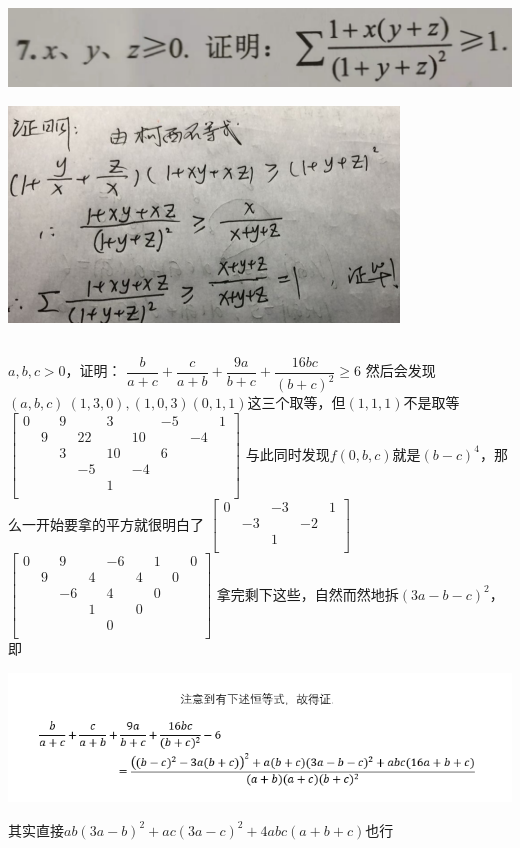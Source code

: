 \documentclass[UTF8]{ctexart}
\begin{document}
\subsection{}
\begin{center}
	\includegraphics[width=0.5\linewidth]{a30}
\end{center}
\begin{center}
	\includegraphics[width=0.5\linewidth]{a31}
\end{center}
\subsection{}$ a,b,c> 0 $，证明：
$ \dfrac{b}{a+c}+\dfrac{c}{a+b}+\dfrac{9a}{b+c}+\dfrac{16bc}{(b+c)^{2}} \geq 6$
然后会发现$ (a,b,c)~(1,3,0),(1,0,3)(0,1,1) $这三个取等，但$ (1,1,1) $不是取等
$ \left[\begin{matrix}
	0& &9& &3& &-5& &1\\
	&9& &22& &10& &-4&\\
	& &3& &10& &6& &\\
	& & &-5& &-4& & &\\
	& & & &1& & & &\\
\end{matrix}\right] $
与此同时发现$ f(0,b,c) $就是$ (b-c)^4 $，那么一开始要拿的平方就很明白了
$ \left[\begin{matrix}
	0& &-3& &1\\
	&-3& &-2&\\
	& &1& &\\
\end{matrix}\right] $
$ \left[\begin{matrix}
	0& &9& &-6& &1& &0\\
	&9& &4& &4& &0&\\
	& &-6& &4& &0& &\\
	& & &1& &0& & &\\
	& & & &0& & & &\\
\end{matrix}\right] $
拿完剩下这些，自然而然地拆$ (3a-b-c)^{2} $，即
\begin{center}
	\includegraphics[width=1\linewidth]{a32}
\end{center}
其实直接$ ab(3a-b)^{2}+ac(3a-c)^{2}+4abc(a+b+c) $也行
\end{document}
